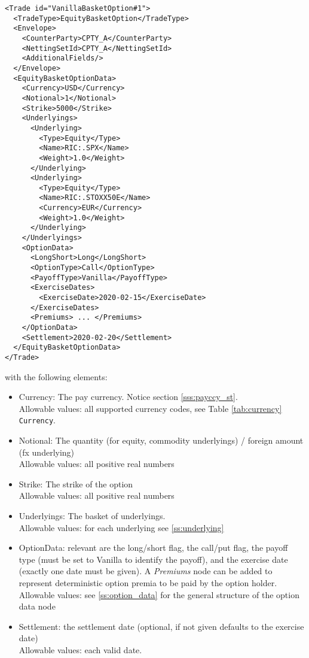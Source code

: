 \begin{verbatim}
<Trade id="VanillaBasketOption#1">
  <TradeType>EquityBasketOption</TradeType>
  <Envelope>
    <CounterParty>CPTY_A</CounterParty>
    <NettingSetId>CPTY_A</NettingSetId>
    <AdditionalFields/>
  </Envelope>
  <EquityBasketOptionData>
    <Currency>USD</Currency>
    <Notional>1</Notional>
    <Strike>5000</Strike>
    <Underlyings>
      <Underlying>
        <Type>Equity</Type>
        <Name>RIC:.SPX</Name>
        <Weight>1.0</Weight>
      </Underlying>
      <Underlying>
        <Type>Equity</Type>
        <Name>RIC:.STOXX50E</Name>
        <Currency>EUR</Currency>
        <Weight>1.0</Weight>
      </Underlying>
    </Underlyings>
    <OptionData>
      <LongShort>Long</LongShort>
      <OptionType>Call</OptionType>
      <PayoffType>Vanilla</PayoffType>
      <ExerciseDates>
        <ExerciseDate>2020-02-15</ExerciseDate>
      </ExerciseDates>
      <Premiums> ... </Premiums>
    </OptionData>
    <Settlement>2020-02-20</Settlement>
  </EquityBasketOptionData>
</Trade>
\end{verbatim}

with the following elements:

\begin{itemize}
\item Currency: The pay currency. Notice section \ref{sss:payccy_st}. \\
  Allowable values: all supported currency codes, see Table \ref{tab:currency} \lstinline!Currency!.
\item Notional: The quantity (for equity, commodity underlyings) / foreign amount (fx underlying) \\
  Allowable values: all positive real numbers
\item Strike: The strike of the option \\
  Allowable values: all positive real numbers
\item Underlyings: The basket of underlyings. \\
  Allowable values: for each underlying see \ref{ss:underlying}
\item OptionData: relevant are the long/short flag, the call/put flag, the payoff type (must be set to Vanilla to
  identify the payoff), and the exercise date (exactly one date must be given). A \emph{Premiums} node can be added to represent deterministic option premia to be paid by the option holder. \\
  Allowable values: see \ref{ss:option_data} for the general structure of the option data node
\item Settlement: the settlement date (optional, if not given defaults to the exercise date) \\
  Allowable values: each valid date.
\end{itemize}

